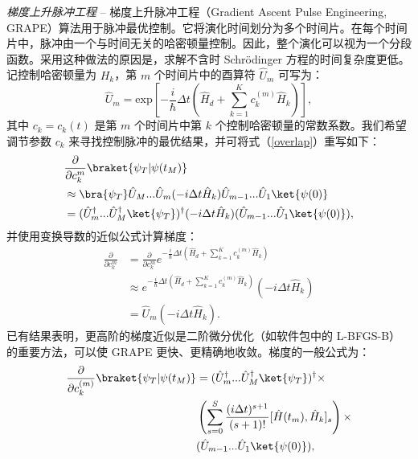 \textit{梯度上升脉冲工程} -- 梯度上升脉冲工程（Gradient Ascent Pulse Engineering, GRAPE）算法用于脉冲最优控制。它将演化时间划分为多个时间片。在每个时间片中，脉冲由一个与时间无关的哈密顿量控制。因此，整个演化可以视为一个分段函数。采用这种做法的原因是，求解不含时 Schr\"{o}dinger 方程的时间复杂度更低。记控制哈密顿量为 $H_{k}$，第 $m$ 个时间片中的酉算符 $\hat{U}_{m}$ 可写为：
\begin{equation}
    \hat{U}_{m}=\mathrm{exp}\left[-\frac{i}{\hbar}\Delta t\left(\hat{H}_{d}+\sum_{k=1}^{K}c_{k}^{(m)}\hat{H}_{k}\right)\right],
\end{equation}
其中 $c_{k}=c_{k}(t)$ 是第 $m$ 个时间片中第 $k$ 个控制哈密顿量的常数系数。我们希望调节参数 $c_{k}$ 来寻找控制脉冲的最优结果，并可将式（\ref{overlap}）重写如下：
\begin{equation}
    \begin{aligned}
         & \frac{\partial}{\partial c_{k}^{m}}\braket{\psi_{T}|\psi(t_M)}                                                                             \\
         & \approx\bra{\psi_{T}}\hat{U}_{M}...\hat{U}_{m}(-i\Delta t\hat{H}_{k})\hat{U}_{m-1}...\hat{U}_{1}\ket{\psi(0)}                              \\
         & =(\hat{U}_{m}^{\dagger}...\hat{U}_{M}^{\dagger}\ket{\psi_{T}})^{\dagger}(-i\Delta t\hat{H}_{k})(\hat{U}_{m-1}...\hat{U}_{1}\ket{\psi(0)}),
    \end{aligned}
\end{equation}
并使用变换导数的近似公式计算梯度：
\begin{equation}
    \begin{aligned}
        \frac{\partial}{\partial c_{k}^{m}} & =\frac{\partial}{\partial c_{k}^{m}}e^{-\frac{i}{\hbar}\Delta t\left(\hat{H}_{d}+\sum_{k=1}^{K}c_{k}^{(m)}\hat{H}_{k}\right)} \\
                                            & \approx e^{-\frac{i}{\hbar}\Delta t\left(\hat{H}_{d}+\sum_{k=1}^{K}c_{k}^{(m)}\hat{H}_{k}\right)}(-i\Delta t\hat{H}_{k})      \\
                                            & =\hat{U}_{m}(-i\Delta t\hat{H}_{k}).
    \end{aligned}
\end{equation}
已有结果表明，更高阶的梯度近似是二阶微分优化（如软件包中的 L-BFGS-B）的重要方法，可以使 GRAPE 更快、更精确地收敛。梯度的一般公式为：
\begin{equation}
    \begin{split}
        \frac{\partial}{\partial c_{k}^{(m)}}\braket{\psi_{T}|\psi(t_{M})}&=(\hat{U}_{m}^{\dagger}...\hat{U}_{M}^{\dagger}\ket{\psi_{T}})^{\dagger}\times\\
        &\left(\sum_{s=0}^{S}\frac{(i\Delta t)^{s+1}}{(s+1)!}[\hat{H}(t_m),\hat{H}_{k}]_s\right)\times\\
        &(\hat{U}_{m-1}...\hat{U}_{1}\ket{\psi(0)}),
    \end{split}
\end{equation}

